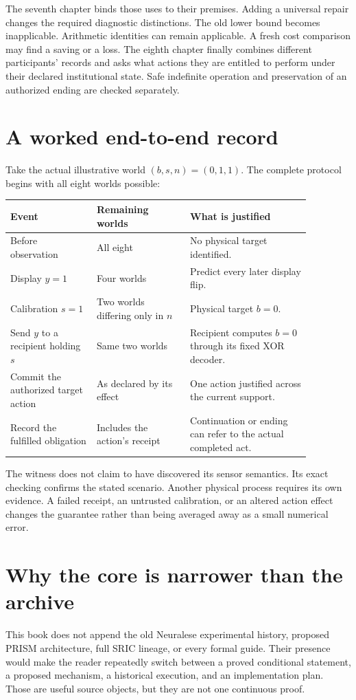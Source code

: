 The seventh chapter binds those uses to their premises. Adding a universal repair changes the required diagnostic distinctions. The old lower bound becomes inapplicable. Arithmetic identities can remain applicable. A fresh cost comparison may find a saving or a loss. The eighth chapter finally combines different participants' records and asks what actions they are entitled to perform under their declared institutional state. Safe indefinite operation and preservation of an authorized ending are checked separately.

\section{A worked end-to-end record}
Take the actual illustrative world $(b,s,n)=(0,1,1)$. The complete protocol begins with all eight worlds possible:
\begin{center}\begin{tabular}{p{0.25\linewidth}p{0.27\linewidth}p{0.35\linewidth}}\toprule
Event & Remaining worlds & What is justified\\\midrule
Before observation & All eight & No physical target identified.\\
Display $y=1$ & Four worlds & Predict every later display flip.\\
Calibration $s=1$ & Two worlds differing only in $n$ & Physical target $b=0$.\\
Send $y$ to a recipient holding $s$ & Same two worlds & Recipient computes $b=0$ through its fixed XOR decoder.\\
Commit the authorized target action & As declared by its effect & One action justified across the current support.\\
Record the fulfilled obligation & Includes the action's receipt & Continuation or ending can refer to the actual completed act.\\\bottomrule\end{tabular}\end{center}

The witness does not claim to have discovered its sensor semantics. Its exact checking confirms the stated scenario. Another physical process requires its own evidence. A failed receipt, an untrusted calibration, or an altered action effect changes the guarantee rather than being averaged away as a small numerical error.

\section{Why the core is narrower than the archive}
This book does not append the old Neuralese experimental history, proposed PRISM architecture, full SRIC lineage, or every formal guide. Their presence would make the reader repeatedly switch between a proved conditional statement, a proposed mechanism, a historical execution, and an implementation plan. Those are useful source objects, but they are not one continuous proof.

